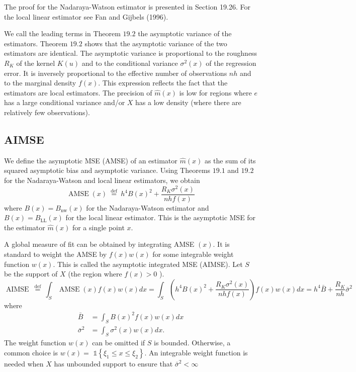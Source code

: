 \documentclass[10pt]{article}
\begin{document}
The proof for the Nadaraya-Watson estimator is presented in Section 19.26. For the local linear estimator see Fan and Gijbels (1996).

We call the leading terms in Theorem $19.2$ the asymptotic variance of the estimators. Theorem $19.2$ shows that the asymptotic variance of the two estimators are identical. The asymptotic variance is proportional to the roughness $R_{K}$ of the kernel $K(u)$ and to the conditional variance $\sigma^{2}(x)$ of the regression error. It is inversely proportional to the effective number of observations $n h$ and to the marginal density $f(x)$. This expression reflects the fact that the estimators are local estimators. The precision of $\widehat{m}(x)$ is low for regions where $e$ has a large conditional variance and/or $X$ has a low density (where there are relatively few observations).

\subsection{AIMSE}
We define the asymptotic MSE (AMSE) of an estimator $\widehat{m}(x)$ as the sum of its squared asymptotic bias and asymptotic variance. Using Theorems $19.1$ and $19.2$ for the Nadaraya-Watson and local linear estimators, we obtain
$$
\operatorname{AMSE}(x) \stackrel{\text { def }}{=} h^{4} B(x)^{2}+\frac{R_{K} \sigma^{2}(x)}{n h f(x)}
$$
where $B(x)=B_{\mathrm{nw}}(x)$ for the Nadaraya-Watson estimator and $B(x)=B_{\mathrm{LL}}(x)$ for the local linear estimator. This is the asymptotic MSE for the estimator $\widehat{m}(x)$ for a single point $x$.

A global measure of fit can be obtained by integrating AMSE $(x)$. It is standard to weight the AMSE by $f(x) w(x)$ for some integrable weight function $w(x)$. This is called the asymptotic integrated MSE (AIMSE). Let $S$ be the support of $X$ (the region where $f(x)>0$ ).
$$
\operatorname{AIMSE} \stackrel{\text { def }}{=} \int_{S} \operatorname{AMSE}(x) f(x) w(x) d x=\int_{S}\left(h^{4} B(x)^{2}+\frac{R_{K} \sigma^{2}(x)}{n h f(x)}\right) f(x) w(x) d x=h^{4} \bar{B}+\frac{R_{K}}{n h} \bar{\sigma}^{2}
$$
where
$$
\begin{aligned}
\bar{B} &=\int_{S} B(x)^{2} f(x) w(x) d x \\
\bar{\sigma}^{2} &=\int_{S} \sigma^{2}(x) w(x) d x .
\end{aligned}
$$
The weight function $w(x)$ can be omitted if $S$ is bounded. Otherwise, a common choice is $w(x)=$ $\mathbb{1}\left\{\xi_{1} \leq x \leq \xi_{2}\right\}$. An integrable weight function is needed when $X$ has unbounded support to ensure that $\bar{\sigma}^{2}<\infty$
\end{document}
